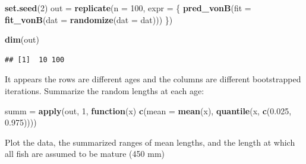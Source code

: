 \documentclass[]{book}
\newenvironment{Shaded}{\begin{snugshade}}{\end{snugshade}}
\newcommand{\ControlFlowTok}[1]{\textcolor[rgb]{0.13,0.29,0.53}{\textbf{#1}}}
\newcommand{\DataTypeTok}[1]{\textcolor[rgb]{0.13,0.29,0.53}{#1}}
\newcommand{\DecValTok}[1]{\textcolor[rgb]{0.00,0.00,0.81}{#1}}
\newcommand{\FloatTok}[1]{\textcolor[rgb]{0.00,0.00,0.81}{#1}}
\newcommand{\KeywordTok}[1]{\textcolor[rgb]{0.13,0.29,0.53}{\textbf{#1}}}
\newcommand{\NormalTok}[1]{#1}
\newcommand{\OperatorTok}[1]{\textcolor[rgb]{0.81,0.36,0.00}{\textbf{#1}}}
\newcommand{\StringTok}[1]{\textcolor[rgb]{0.31,0.60,0.02}{#1}}
\begin{document}
\begin{Shaded}
\begin{Highlighting}[]
\KeywordTok{set.seed}\NormalTok{(}\DecValTok{2}\NormalTok{)}
\NormalTok{out =}\StringTok{ }\KeywordTok{replicate}\NormalTok{(}\DataTypeTok{n =} \DecValTok{100}\NormalTok{, }\DataTypeTok{expr =}\NormalTok{ \{}
  \KeywordTok{pred_vonB}\NormalTok{(}\DataTypeTok{fit =} \KeywordTok{fit_vonB}\NormalTok{(}\DataTypeTok{dat =} \KeywordTok{randomize}\NormalTok{(}\DataTypeTok{dat =}\NormalTok{ dat)))}
\NormalTok{\})}

\KeywordTok{dim}\NormalTok{(out)}
\end{Highlighting}
\end{Shaded}

\begin{verbatim}
## [1]  10 100
\end{verbatim}

It appears the rows are different ages and the columns are different bootstrapped iterations. Summarize the random lengths at each age:

\begin{Shaded}
\begin{Highlighting}[]
\NormalTok{summ =}\StringTok{ }\KeywordTok{apply}\NormalTok{(out, }\DecValTok{1}\NormalTok{, }\ControlFlowTok{function}\NormalTok{(x) }\KeywordTok{c}\NormalTok{(}\DataTypeTok{mean =} \KeywordTok{mean}\NormalTok{(x), }\KeywordTok{quantile}\NormalTok{(x, }\KeywordTok{c}\NormalTok{(}\FloatTok{0.025}\NormalTok{, }\FloatTok{0.975}\NormalTok{))))}
\end{Highlighting}
\end{Shaded}

Plot the data, the summarized ranges of mean lengths, and the length at which all fish are assumed to be mature (450 mm)

\begin{Shaded}
\end{Shaded}
\end{document}
